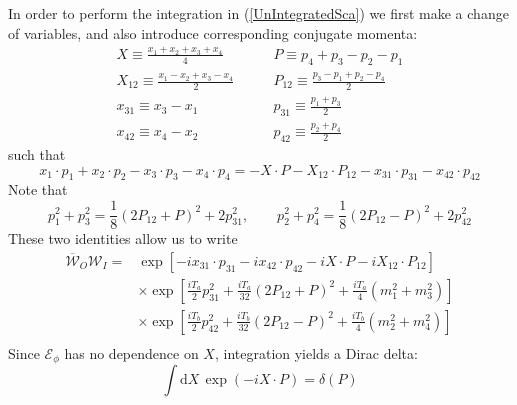 In order to perform the integration in (\ref{UnIntegratedSca}) we first make a change of variables, and also introduce corresponding conjugate momenta:
\begin{equation}
\begin{split}
	X \equiv \frac{x_{1} + x_{2} + x_{3} + x_{4}}{4} &\qquad P \equiv p_{4} + p_{3} - p_{2} - p_{1} \\
	X_{12} \equiv \frac{x_{1} - x_{2} + x_{3} - x_{4}}{2} &\qquad P_{12} \equiv \frac{p_{3} - p_{1} + p_{2} - p_{4}}{2} \\
	x_{31} \equiv x_{3} - x_{1} &\qquad p_{31} \equiv \frac{p_{1} + p_{3}}{2} \\
	x_{42} \equiv x_{4} - x_{2} &\qquad p_{42} \equiv \frac{p_{2} + p_{4}}{2}
\end{split}
\end{equation}
such that
\begin{equation}
	x_{1} \cdot p_{1} + x_{2} \cdot p_{2} - x_{3} \cdot p_{3} - x_{4} \cdot p_{4} = - X \cdot P - X_{12} \cdot P_{12} - x_{31} \cdot p_{31} - x_{42} \cdot p_{42}
\end{equation}
Note that
\begin{equation}
	p_{1}^{2} + p_{3}^{2} = \frac{1}{8} \left(2 P_{12} + P \right)^{2} + 2 p_{31}^{2}, \qquad p_{2}^{2} + p_{4}^{2} = \frac{1}{8} \left(2 P_{12} - P \right)^{2} + 2 p_{42}^{2}
\end{equation}
These two identities allow us to write
\begin{equation}
\begin{split}
	\overline{\mathcal{W}}_{O} \mathcal{W}_{I} = {}& \exp{\left[ -i x_{31} \cdot p_{31} -i x_{42} \cdot p_{42} - i X \cdot P -i X_{12} \cdot P_{12} \right]} \\
	&\times \exp{\left[ \frac{i T_{a}}{2} p_{31}^{2} + \frac{i T_{a}}{32} \left(2 P_{12} + P \right)^{2} + \frac{i T_{a}}{4} (m_{1}^{2} + m_{3}^{2}) \right]} \\
	&\times \exp{\left[ \frac{i T_{b}}{2} p_{42}^{2} + \frac{i T_{b}}{32} \left(2 P_{12} - P \right)^{2} + \frac{i T_{b}}{4} (m_{2}^{2} + m_{4}^{2}) \right]} \\
\end{split}
\end{equation}
Since $\mathcal{E}_{\phi}$ has no dependence on $X$, integration yields a Dirac delta:
\begin{equation}
	\int \mathrm{d}X \, \exp{\left(- i X \cdot P \right)} = \delta(P)
\end{equation}
